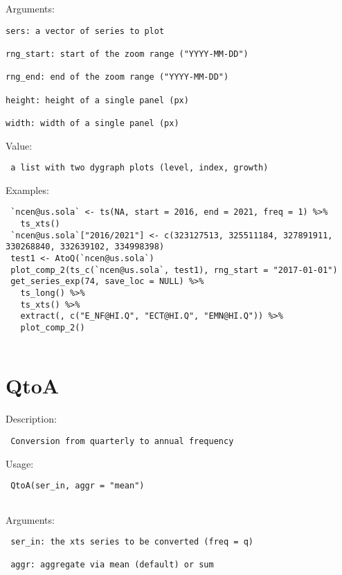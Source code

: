 \documentclass[
  letterpaper,
  DIV=11,
  numbers=noendperiod]{scrreport}
\begin{document}
Arguments:

\begin{verbatim}
sers: a vector of series to plot

rng_start: start of the zoom range ("YYYY-MM-DD")

rng_end: end of the zoom range ("YYYY-MM-DD")

height: height of a single panel (px)

width: width of a single panel (px)
\end{verbatim}

Value:

\begin{verbatim}
 a list with two dygraph plots (level, index, growth)
\end{verbatim}

Examples:

\begin{verbatim}
 `ncen@us.sola` <- ts(NA, start = 2016, end = 2021, freq = 1) %>% 
   ts_xts()
 `ncen@us.sola`["2016/2021"] <- c(323127513, 325511184, 327891911, 330268840, 332639102, 334998398)
 test1 <- AtoQ(`ncen@us.sola`)
 plot_comp_2(ts_c(`ncen@us.sola`, test1), rng_start = "2017-01-01")
 get_series_exp(74, save_loc = NULL) %>%
   ts_long() %>%
   ts_xts() %>%
   extract(, c("E_NF@HI.Q", "ECT@HI.Q", "EMN@HI.Q")) %>%
   plot_comp_2()
 
\end{verbatim}

\hypertarget{qtoa}{%
\section{QtoA}\label{qtoa}}

Description:

\begin{verbatim}
 Conversion from quarterly to annual frequency
\end{verbatim}

Usage:

\begin{verbatim}
 QtoA(ser_in, aggr = "mean")
 
\end{verbatim}

Arguments:

\begin{verbatim}
 ser_in: the xts series to be converted (freq = q)

 aggr: aggregate via mean (default) or sum
\end{verbatim}
\end{document}
